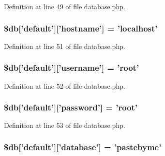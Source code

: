 Definition at line 49 of file database.\-php.

\hypertarget{development_2database_8php_a987b8cb0ae83b9519cb7c36fe25dbdd8}{
\subsubsection[{\$db}]{\setlength{\rightskip}{0pt plus 5cm}\$db\mbox{[}'default'\mbox{]}\mbox{[}'hostname'\mbox{]} = 'localhost'}}\label{development_2database_8php_a987b8cb0ae83b9519cb7c36fe25dbdd8}


Definition at line 51 of file database.\-php.

\hypertarget{development_2database_8php_a2f535f16fa00521992cfc791c8dcec37}{
\subsubsection[{\$db}]{\setlength{\rightskip}{0pt plus 5cm}\$db\mbox{[}'default'\mbox{]}\mbox{[}'username'\mbox{]} = 'root'}}\label{development_2database_8php_a2f535f16fa00521992cfc791c8dcec37}


Definition at line 52 of file database.\-php.

\hypertarget{development_2database_8php_a1f6afce218438d9f7d13e28ee602e29b}{
\subsubsection[{\$db}]{\setlength{\rightskip}{0pt plus 5cm}\$db\mbox{[}'default'\mbox{]}\mbox{[}'password'\mbox{]} = 'root'}}\label{development_2database_8php_a1f6afce218438d9f7d13e28ee602e29b}


Definition at line 53 of file database.\-php.

\hypertarget{development_2database_8php_a87e73e2a5365d1ee95a673b551238fef}{
\subsubsection[{\$db}]{\setlength{\rightskip}{0pt plus 5cm}\$db\mbox{[}'default'\mbox{]}\mbox{[}'database'\mbox{]} = 'pastebyme'}}\label{development_2database_8php_a87e73e2a5365d1ee95a673b551238fef}


